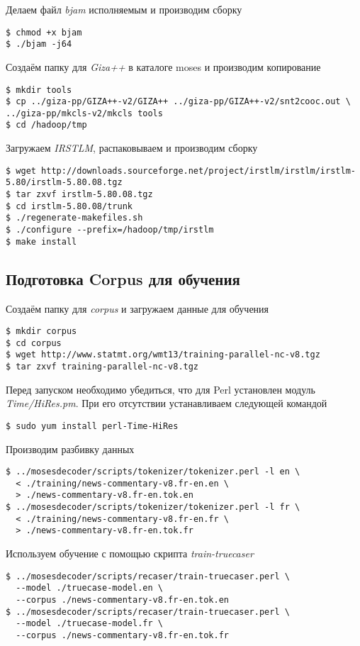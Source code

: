 Делаем файл \emph{bjam} исполняемым и производим сборку
\begin{lstlisting}
$ chmod +x bjam
$ ./bjam -j64
\end{lstlisting}

Создаём папку для \emph{Giza++} в каталоге moses и производим копирование
\begin{lstlisting}
$ mkdir tools
$ cp ../giza-pp/GIZA++-v2/GIZA++ ../giza-pp/GIZA++-v2/snt2cooc.out \
../giza-pp/mkcls-v2/mkcls tools
$ cd /hadoop/tmp
\end{lstlisting}

Загружаем \emph{IRSTLM}, распаковываем и производим сборку
\begin{lstlisting}
$ wget http://downloads.sourceforge.net/project/irstlm/irstlm/irstlm-5.80/irstlm-5.80.08.tgz
$ tar zxvf irstlm-5.80.08.tgz
$ cd irstlm-5.80.08/trunk
$ ./regenerate-makefiles.sh
$ ./configure --prefix=/hadoop/tmp/irstlm
$ make install
\end{lstlisting}

\subsection{Подготовка Corpus для обучения}
Создаём папку для \emph{corpus} и загружаем данные для обучения
\begin{lstlisting}
$ mkdir corpus
$ cd corpus
$ wget http://www.statmt.org/wmt13/training-parallel-nc-v8.tgz
$ tar zxvf training-parallel-nc-v8.tgz
\end{lstlisting}

Перед запуском необходимо убедиться, что для Perl установлен модуль \emph{Time/HiRes.pm}.
При его отсутствии устанавливаем следующей командой
\begin{lstlisting}
$ sudo yum install perl-Time-HiRes
\end{lstlisting}

Производим разбивку данных
\begin{lstlisting}
$ ../mosesdecoder/scripts/tokenizer/tokenizer.perl -l en \
  < ./training/news-commentary-v8.fr-en.en \
  > ./news-commentary-v8.fr-en.tok.en
$ ../mosesdecoder/scripts/tokenizer/tokenizer.perl -l fr \
  < ./training/news-commentary-v8.fr-en.fr \
  > ./news-commentary-v8.fr-en.tok.fr
\end{lstlisting}

Используем обучение с помощью скрипта \emph{train-truecaser}
\begin{lstlisting}
$ ../mosesdecoder/scripts/recaser/train-truecaser.perl \
  --model ./truecase-model.en \
  --corpus ./news-commentary-v8.fr-en.tok.en
$ ../mosesdecoder/scripts/recaser/train-truecaser.perl \
  --model ./truecase-model.fr \
  --corpus ./news-commentary-v8.fr-en.tok.fr
\end{lstlisting}

